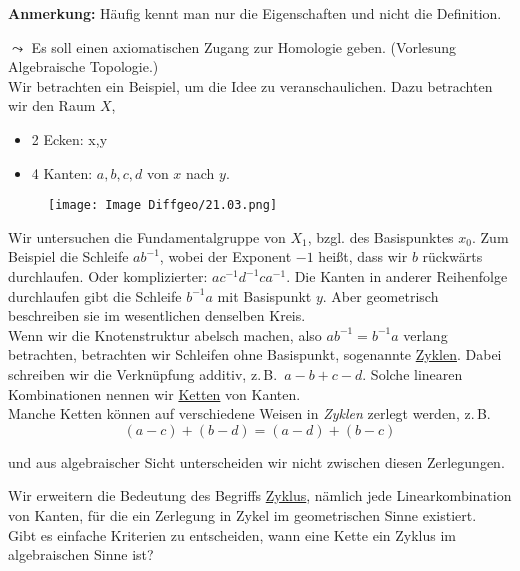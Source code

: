 \documentclass[fleqn, 12pt, letterpaper]{article}
\begin{document}
\textbf{Anmerkung:} Häufig kennt man nur die Eigenschaften und nicht die Definition.

\hspace{1em} \(\leadsto\) Es soll einen axiomatischen Zugang zur Homologie geben. (Vorlesung Algebraische Topologie.)\\

Wir betrachten ein Beispiel, um die Idee zu veranschaulichen. Dazu betrachten wir den Raum \(X\),

\begin{itemize}
    \item 2 Ecken: x,y
    \item 4 Kanten: $a,b,c,d$ von \(x\) nach \(y\).
\end{itemize}

\begin{figure}[H]
    \centering
    \texttt{[image: Image Diffgeo/21.03.png]}

 \end{figure}
 
Wir untersuchen die Fundamentalgruppe von \(X_1\), bzgl. des Basispunktes \(x_0\). Zum Beispiel die Schleife \(ab^{-1}\), wobei der Exponent \(-1\) heißt, dass wir \(b\) rückwärts durchlaufen. Oder komplizierter: \(ac^{-1}d^{-1}ca^{-1}\). Die Kanten in anderer Reihenfolge durchlaufen gibt die Schleife \(b^{-1}a\) mit Basispunkt \(y\). Aber geometrisch beschreiben sie im wesentlichen denselben Kreis.\\

Wenn wir die Knotenstruktur abelsch machen, also \(ab^{-1}=b^{-1}a\) verlang betrachten, betrachten wir Schleifen ohne Basispunkt, sogenannte \underline{Zyklen}. Dabei schreiben wir die Verknüpfung additiv, z.\,B.\ \(a - b + c - d\). Solche linearen Kombinationen nennen wir \underline{Ketten} von Kanten.\\

Manche Ketten können auf verschiedene Weisen in \emph{Zyklen} zerlegt werden, z.\,B.\
\[
(a - c) + (b - d) = (a - d) + (b - c)
\]

und aus algebraischer Sicht unterscheiden wir nicht zwischen diesen Zerlegungen.

Wir erweitern die Bedeutung des Begriffs \underline{Zyklus}, nämlich jede Linearkombination von Kanten, für die ein Zerlegung in Zykel im geometrischen Sinne existiert.\\

Gibt es einfache Kriterien zu entscheiden, wann eine Kette ein Zyklus im algebraischen Sinne ist?
\end{document}
